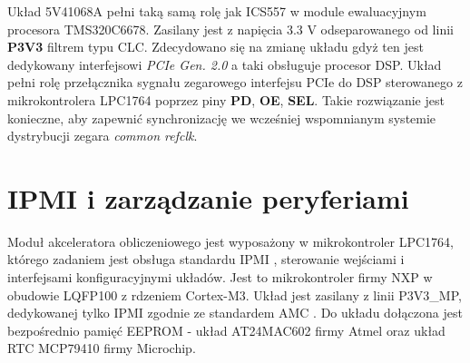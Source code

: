 Układ 5V41068A pełni taką samą rolę jak ICS557 w module ewaluacyjnym procesora TMS320C6678. Zasilany jest z napięcia 3.3 V odseparowanego od linii \textbf{P3V3} filtrem typu CLC.  Zdecydowano się na zmianę układu gdyż ten jest dedykowany interfejsowi \textit{PCIe Gen. 2.0} a taki obsługuje procesor DSP. Układ pełni rolę przełącznika sygnału zegarowego interfejsu PCIe do DSP sterowanego z mikrokontrolera LPC1764 poprzez piny \textbf{PD}, \textbf{OE}, \textbf{SEL}. Takie rozwiązanie jest konieczne, aby zapewnić synchronizację we wcześniej wspomnianym systemie dystrybucji zegara \textit{common refclk}. %


%

\section{IPMI i zarządzanie peryferiami}
Moduł akceleratora obliczeniowego jest wyposażony w mikrokontroler LPC1764, którego zadaniem jest obsługa standardu IPMI \cite{IPMI} \cite{LPC1764}, sterowanie wejściami i interfejsami konfiguracyjnymi układów. Jest to mikrokontroler firmy NXP w obudowie LQFP100 z rdzeniem Cortex-M3. Układ jest zasilany z linii P3V3\_MP,  dedykowanej tylko IPMI zgodnie ze standardem AMC \cite[4.22]{AMC_BASE}. Do układu dołączona jest bezpośrednio pamięć EEPROM - układ AT24MAC602 \cite{AT24MAC602} firmy Atmel \cite{ATMEL} oraz układ RTC MCP79410 \cite{MCP79410} firmy Microchip.


